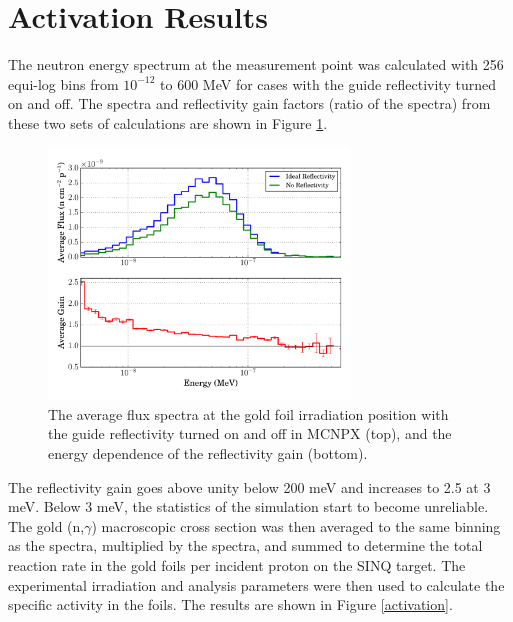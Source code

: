 \documentclass[a4paper,
              ]{jacow}
\begin{document}
\section{Activation Results}

The neutron energy spectrum at the measurement point was calculated with 256 equi-log bins from $10^{-12}$ to 600 MeV for cases with the guide reflectivity turned on and off.  The spectra and reflectivity gain factors (ratio of the spectra) from these two sets of calculations are shown in Figure \ref{gain}.  

\begin{figure}[!htb]
   \centering
   \includegraphics*[trim = 0mm 5mm 0mm 5mm, width=80mm]{THPF102f5.pdf}
   \caption{The average flux spectra at the gold foil irradiation position with the guide reflectivity turned on and off in MCNPX (top), and the energy dependence of the reflectivity gain (bottom).}
   \label{gain}
\end{figure}

The reflectivity gain goes above unity below 200 meV and increases to 2.5 at 3 meV.  Below 3 meV, the statistics of the simulation start to become unreliable.  The gold (n,$\gamma$) macroscopic cross section was then averaged to the same binning as the spectra, multiplied by the spectra, and summed to determine the total reaction rate in the gold foils per incident proton on the SINQ target.  The experimental irradiation and analysis parameters were then used to calculate the specific activity in the foils.  The results are shown in Figure \ref{activation}.
\end{document}
